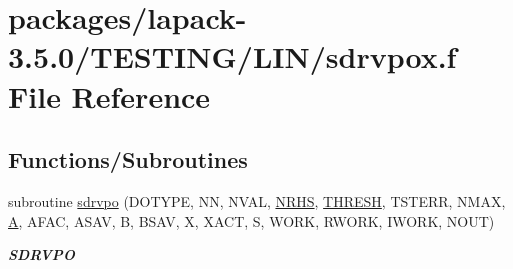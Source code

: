 \hypertarget{sdrvpox_8f}{}\section{packages/lapack-\/3.5.0/\+T\+E\+S\+T\+I\+N\+G/\+L\+I\+N/sdrvpox.f File Reference}
\label{sdrvpox_8f}
\subsection*{Functions/\+Subroutines}
\begin{DoxyCompactItemize}
\item 
subroutine \hyperlink{group__single__lin_ga507a0c7f9896feb4fa6fc82a12ec888f}{sdrvpo} (D\+O\+T\+Y\+P\+E, N\+N, N\+V\+A\+L, \hyperlink{example__user_8c_aa0138da002ce2a90360df2f521eb3198}{N\+R\+H\+S}, \hyperlink{zlaqgs_8c_a0656018abfc9fa2821827415f5d5ea57}{T\+H\+R\+E\+S\+H}, T\+S\+T\+E\+R\+R, N\+M\+A\+X, \hyperlink{classA}{A}, A\+F\+A\+C, A\+S\+A\+V, B, B\+S\+A\+V, X, X\+A\+C\+T, S, W\+O\+R\+K, R\+W\+O\+R\+K, I\+W\+O\+R\+K, N\+O\+U\+T)
\begin{DoxyCompactList}\small\item\em {\bfseries S\+D\+R\+V\+P\+O} \end{DoxyCompactList}\end{DoxyCompactItemize}
